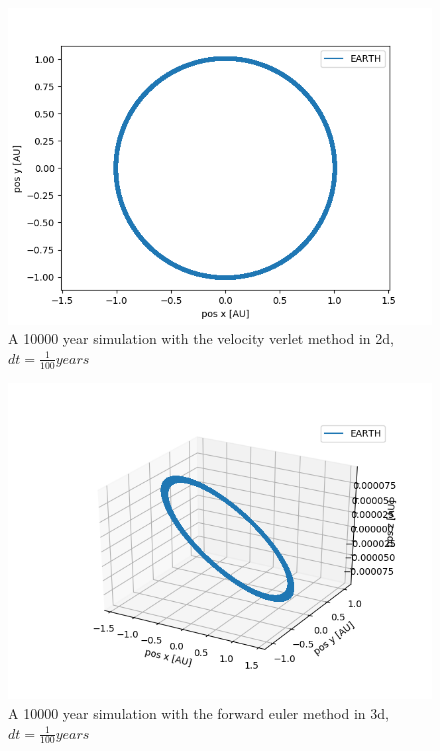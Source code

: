 \documentclass[a4paper]{article}
\begin{document}
\begin{figure}[h!]
	\centering 
	\includegraphics[scale=0.7]{vv1e4_2d.png}
	\caption{A 10000 year simulation with the velocity verlet method in 2d, $dt = \frac{1}{100}years$}
	\label{computation time plot}
\end{figure}
\begin{figure}[h!]
	\centering 
	\includegraphics[scale=0.7]{fe1e4_3d.png}
	\caption{A 10000 year simulation with the forward euler method in 3d, $dt = \frac{1}{100}years$}
	\label{forw_eul2d}
\end{figure}
\end{document}
